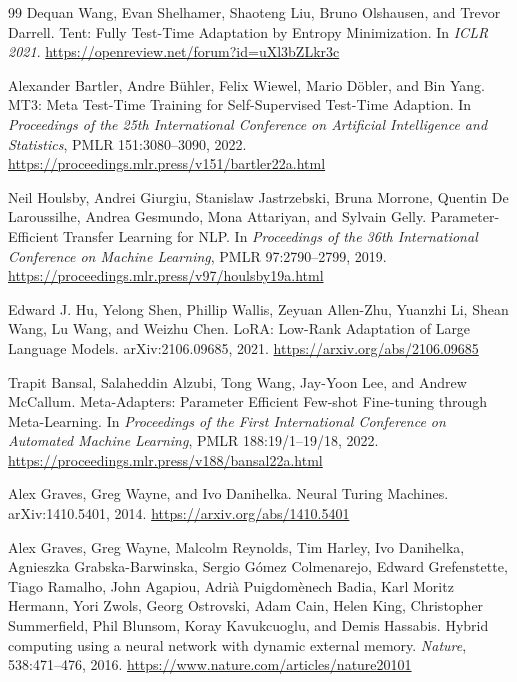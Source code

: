 \documentclass[11pt,a4paper]{article}
\begin{document}
\begin{thebibliography}{99}
Dequan Wang, Evan Shelhamer, Shaoteng Liu, Bruno Olshausen, and Trevor Darrell.
\newblock Tent: Fully Test-Time Adaptation by Entropy Minimization.
\newblock In \emph{ICLR 2021}.
\newblock \url{https://openreview.net/forum?id=uXl3bZLkr3c}

Alexander Bartler, Andre B{\"u}hler, Felix Wiewel, Mario D{\"o}bler, and Bin Yang.
\newblock MT3: Meta Test-Time Training for Self-Supervised Test-Time Adaption.
\newblock In \emph{Proceedings of the 25th International Conference on Artificial Intelligence and Statistics}, PMLR 151:3080--3090, 2022.
\newblock \url{https://proceedings.mlr.press/v151/bartler22a.html}

Neil Houlsby, Andrei Giurgiu, Stanislaw Jastrzebski, Bruna Morrone, Quentin De Laroussilhe, Andrea Gesmundo, Mona Attariyan, and Sylvain Gelly.
\newblock Parameter-Efficient Transfer Learning for NLP.
\newblock In \emph{Proceedings of the 36th International Conference on Machine Learning}, PMLR 97:2790--2799, 2019.
\newblock \url{https://proceedings.mlr.press/v97/houlsby19a.html}

Edward J. Hu, Yelong Shen, Phillip Wallis, Zeyuan Allen-Zhu, Yuanzhi Li, Shean Wang, Lu Wang, and Weizhu Chen.
\newblock LoRA: Low-Rank Adaptation of Large Language Models.
\newblock arXiv:2106.09685, 2021.
\newblock \url{https://arxiv.org/abs/2106.09685}

Trapit Bansal, Salaheddin Alzubi, Tong Wang, Jay-Yoon Lee, and Andrew McCallum.
\newblock Meta-Adapters: Parameter Efficient Few-shot Fine-tuning through Meta-Learning.
\newblock In \emph{Proceedings of the First International Conference on Automated Machine Learning}, PMLR 188:19/1--19/18, 2022.
\newblock \url{https://proceedings.mlr.press/v188/bansal22a.html}

Alex Graves, Greg Wayne, and Ivo Danihelka.
\newblock Neural Turing Machines.
\newblock arXiv:1410.5401, 2014.
\newblock \url{https://arxiv.org/abs/1410.5401}

Alex Graves, Greg Wayne, Malcolm Reynolds, Tim Harley, Ivo Danihelka, Agnieszka Grabska-Barwinska, Sergio G{\'o}mez Colmenarejo, Edward Grefenstette, Tiago Ramalho, John Agapiou, Adri{\`a} Puigdom{\`e}nech Badia, Karl Moritz Hermann, Yori Zwols, Georg Ostrovski, Adam Cain, Helen King, Christopher Summerfield, Phil Blunsom, Koray Kavukcuoglu, and Demis Hassabis.
\newblock Hybrid computing using a neural network with dynamic external memory.
\newblock \emph{Nature}, 538:471--476, 2016.
\newblock \url{https://www.nature.com/articles/nature20101}


\end{thebibliography}
\end{document}
